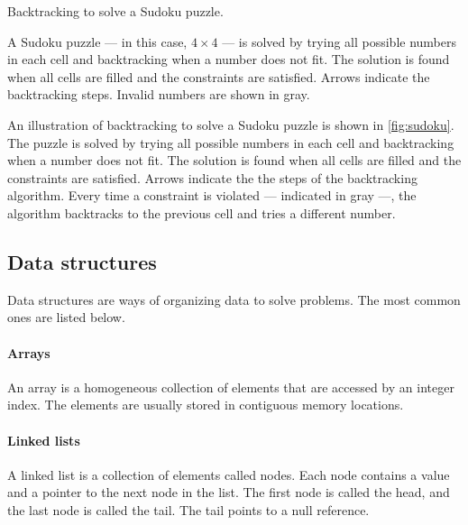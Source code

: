 \begin{figurebox}[label=fig:sudoku]{Backtracking to solve a Sudoku puzzle.}
  \tcblower
  A Sudoku puzzle --- in this case, $4 \times 4$ --- is solved by trying all possible
  numbers in each cell and backtracking when a number does not fit.  The solution is found
  when all cells are filled and the constraints are satisfied.  Arrows indicate the
  backtracking steps.  Invalid numbers are shown in gray.
\end{figurebox}

An illustration of backtracking to solve a Sudoku puzzle is shown in \cref{fig:sudoku}.
The puzzle is solved by trying all possible numbers in each cell and backtracking when a
number does not fit.  The solution is found when all cells are filled and the constraints
are satisfied.  Arrows indicate the the steps of the backtracking algorithm.  Every time a
constraint is violated --- indicated in gray ---, the algorithm backtracks to the previous
cell and tries a different number.

\subsection{Data structures}

Data structures are ways of organizing data to solve problems.  The most common ones
are listed below.

\paragraph{Arrays}  An array is a homogeneous collection of elements that are accessed by
an integer index.  The elements are usually stored in contiguous memory locations.

\paragraph{Linked lists}  A linked list is a collection of elements called nodes.  Each
node contains a value and a pointer to the next node in the list.  The first node is
called the head, and the last node is called the tail.  The tail points to a null
reference.

